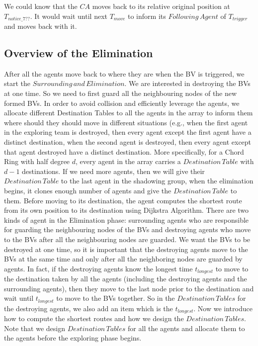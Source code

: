 \documentclass[conference]{IEEEtran}
\begin{document}
We could know that the $CA$ moves back to its relative original position at $T_{notice\_7??}$. It would wait until next $T_{move}$ to inform its $Following\,Agent$ of $T_{trigger}$ and moves back with it.

\subsection{Overview of the Elimination}
After all the agents move back to where they are when the BV is triggered, we start the $Surrounding\,and\,Elimination$. We are interested in destroying the BVs at one time. So we need to first guard all the neighbouring nodes of the new formed BVs. In order to avoid collision and efficiently leverage the agents, we allocate different Destination Tables to all the agents in the array to inform them where should they should move in different situations (e.g., when the first agent in the exploring team is destroyed, then every agent except the first agent have a distinct destination, when the second agent is destroyed, then every agent except that agent destroyed have a distinct destination. More specifically, for a Chord Ring with half degree $d$, every agent in the array carries a $Destination\,Table$ with $d-1$ destinations. If we need more agents, then we will give their $Destination\,Table$ to the last agent in the shadowing group, when the elimination begins, it clones enough number of agents and give the $Destination\, Table$ to them. Before moving to its destination, the agent computes the shortest route from its own position to its destination using Dijkstra Algorithm. There are two kinds of agent in the Elimination phase: surrounding agents who are responsible for guarding the neighbouring nodes of the BVs and destroying agents who move to the BVs after all the neighbouring nodes are guarded. We want the BVs to be destroyed at one time, so it is important that the destroying agents move to the BVs at the same time and only after all the neighboring nodes are guarded by agents. In fact, if the destroying agents know the longest time $t_{longest}$ to move to the destination taken by all the agents (including the destroying agents and the surrounding agents), then they move to the last node prior to the destination and wait until $t_{longest}$ to move to the BVs together. So in the $Destination\,Tables$ for the destroying agents, we also add an item which is the $t_{longest}$. Now we introduce how to compute the shortest routes and how we design the $Destination\,Tables$. Note that we design $Destination\,Tables$ for all the agents and allocate them to the agents before the exploring phase begins.
\end{document}

